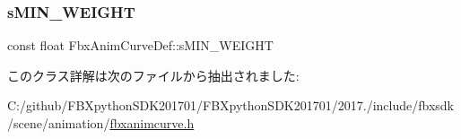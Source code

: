 \mbox{\label{class_fbx_anim_curve_def_a469319cefa59b62fd38985b837e49d07}} 
\subsubsection{\texorpdfstring{s\+M\+I\+N\+\_\+\+W\+E\+I\+G\+HT}{sMIN\_WEIGHT}}
{\footnotesize\ttfamily const float Fbx\+Anim\+Curve\+Def\+::s\+M\+I\+N\+\_\+\+W\+E\+I\+G\+HT\hspace{0.3cm}{\ttfamily [static]}}



このクラス詳解は次のファイルから抽出されました\+:\begin{DoxyCompactItemize}
\item 
C\+:/github/\+F\+B\+Xpython\+S\+D\+K201701/\+F\+B\+Xpython\+S\+D\+K201701/2017./include/fbxsdk/scene/animation/\hyperlink{fbxanimcurve_8h}{fbxanimcurve.\+h}\end{DoxyCompactItemize}
